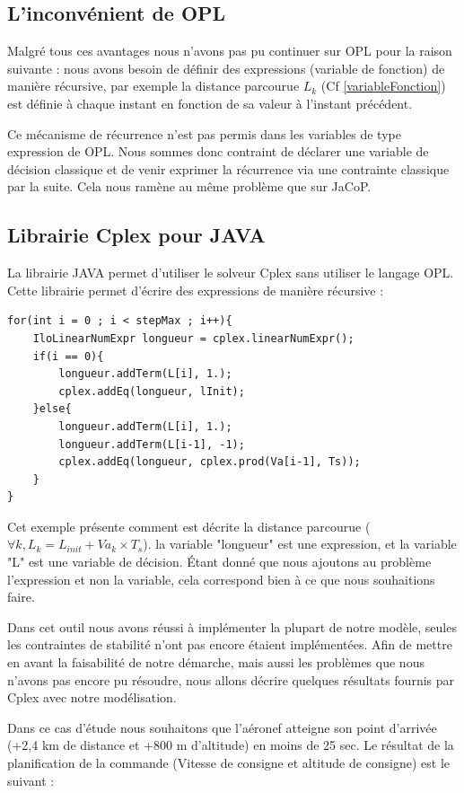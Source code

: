 \subsection{L'inconvénient de OPL}
Malgré tous ces avantages nous n'avons pas pu continuer sur OPL pour la raison suivante : nous avons besoin de définir des expressions (variable de fonction) de manière récursive, par exemple la distance parcourue $L_k$ (Cf \ref{variableFonction}) est définie à chaque instant en fonction de sa valeur à l'instant précédent.

Ce mécanisme de récurrence n'est pas permis dans les variables de type expression de OPL. Nous sommes donc contraint de déclarer une variable de décision classique et de venir exprimer la récurrence via une contrainte classique par la suite. Cela nous ramène au même problème que sur JaCoP.

\subsection{Librairie Cplex pour JAVA}

La librairie JAVA permet d'utiliser le solveur Cplex sans utiliser le langage OPL. Cette librairie permet d'écrire des expressions de manière récursive :
\begin{verbatim}
for(int i = 0 ; i < stepMax ; i++){
    IloLinearNumExpr longueur = cplex.linearNumExpr();
    if(i == 0){
        longueur.addTerm(L[i], 1.);
        cplex.addEq(longueur, lInit);	        		 
    }else{
        longueur.addTerm(L[i], 1.);
        longueur.addTerm(L[i-1], -1);
        cplex.addEq(longueur, cplex.prod(Va[i-1], Ts));
    }
}
\end{verbatim} 
Cet exemple présente comment est décrite la distance parcourue ($\forall k, L_k = L_{init} + Va_k\times T_s$). la variable "longueur" est une expression, et la variable "L" est une variable de décision. Étant donné que nous ajoutons au problème l'expression et non la variable, cela correspond bien à ce que nous souhaitions faire.

Dans cet outil nous avons réussi à implémenter la plupart de notre modèle, seules les contraintes de stabilité n'ont pas encore étaient implémentées.
Afin de mettre en avant la faisabilité de notre démarche, mais aussi les problèmes que nous n'avons pas encore pu résoudre, nous allons décrire quelques résultats fournis par Cplex avec notre modélisation.

Dans ce cas d'étude nous souhaitons que l'aéronef atteigne son point d'arrivée (+2,4 km de distance et +800 m d'altitude) en moins de 25 sec.
Le résultat de la planification de la commande (Vitesse de consigne et altitude de consigne) est le suivant : 

